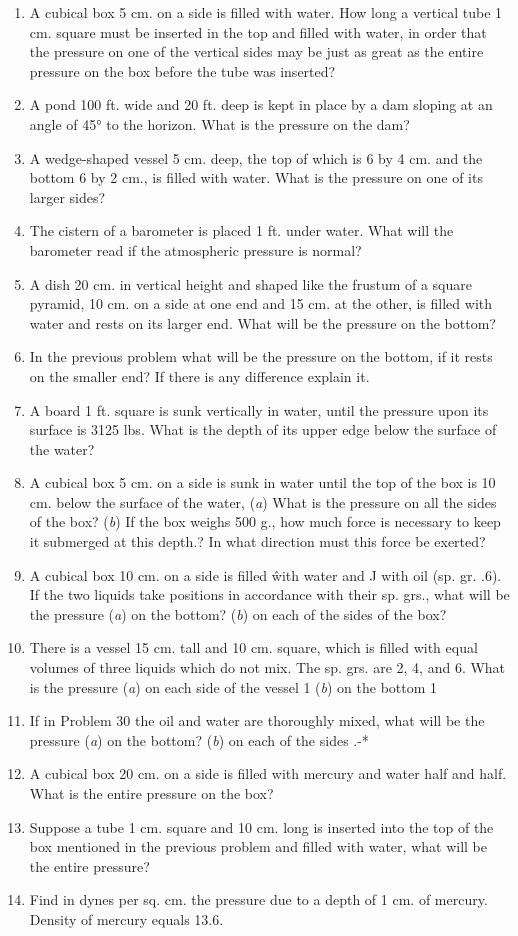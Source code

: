\documentclass[11pt]{article}
\begin{document}
\begin{enumerate}
\item A cubical box 5 cm. on a side is filled with water. How long a vertical tube 1 cm. square must be inserted in the top and filled with water, in order that the pressure on one of the vertical sides may be just as great as the entire pressure on the box before the tube was inserted?
\item A pond 100 ft. wide and 20 ft. deep is kept in place by a dam sloping at an angle of 45° to the horizon. What is the pressure on the dam?
\item A wedge-shaped vessel 5 cm. deep, the top of which is 6 by 4 cm. and the bottom 6 by 2 cm., is filled with water. What is the pressure on one of its larger sides?
\item The cistern of a barometer is placed 1 ft. under water. What will the barometer read if the atmospheric pressure is normal?
\item A dish 20 cm. in vertical height and shaped like the frustum of a square pyramid, 10 cm. on a side at one end and 15 cm. at the other, is filled with water and rests on its larger end. What will be the pressure on the bottom?
\item In the previous problem what will be the pressure on the bottom, if it rests on the smaller end? If there is any difference explain it.
\item A board 1 ft. square is sunk vertically in water, until the pressure upon its surface is 3125 lbs. What is the depth of its upper edge below the surface of the water?
\item A cubical box 5 cm. on a side is sunk in water until the top of the box is 10 cm. below the surface of the water, (\emph{a}) What is the pressure on all the sides of the box? (\emph{b}) If the box weighs 500 g., how much force is necessary to keep it submerged at this depth.? In what direction must this force be exerted?
\item A cubical box 10 cm. on a side is filled \^ with water and J with oil (sp. gr. .6). If the two liquids take positions in accordance with their sp. grs., what will be the pressure (\emph{a}) on the bottom? (\emph{b}) on each of the sides of the box?
\item There is a vessel 15 cm. tall and 10 cm. square, which is filled with equal volumes of three liquids which do not mix. The sp. grs. are 2, 4, and 6. What is the pressure (\emph{a}) on each side of the vessel 1 (\emph{b}) on the bottom 1
\item If in Problem 30 the oil and water are thoroughly mixed, what will be the pressure (\emph{a}) on the bottom? (\emph{b}) on each of the sides .-*
\item A cubical box 20 cm. on a side is filled with mercury and water half and half. What is the entire pressure on the box?
\item Suppose a tube 1 cm. square and 10 cm. long is inserted into the top of the box mentioned in the previous problem and filled with water, what will be the entire pressure?
\item Find in dynes per sq. cm. the pressure due to a depth of 1 cm. of mercury. Density of mercury equals 13.6.
	\end{enumerate}
\end{document}
